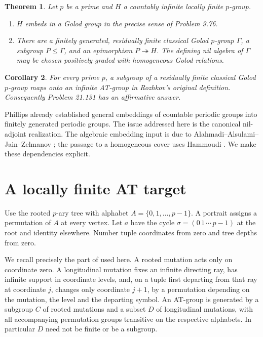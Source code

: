\documentclass[11pt]{article}
\newtheorem{theorem}{Theorem}
\newtheorem{corollary}[theorem]{Corollary}
\theoremstyle{definition}
\begin{document}
\begin{theorem}\label{thm:main}
Let \(p\) be a prime and \(H\) a countably infinite locally finite
\(p\)-group.
\begin{enumerate}[label=(\roman*),nosep]
\item \(H\) embeds in a Golod group in the precise sense of Problem 9.76.
\item There are a finitely generated, residually finite classical Golod
\(p\)-group \(\Gamma\), a subgroup \(P\leq\Gamma\), and an epimorphism
\(P\twoheadrightarrow H\). The defining nil algebra of \(\Gamma\) may be
chosen positively graded with homogeneous Golod relations.
\end{enumerate}
\end{theorem}

\begin{corollary}\label{cor:AT}
For every prime \(p\), a subgroup of a residually finite classical Golod
\(p\)-group maps onto an infinite AT-group in Rozhkov's original definition.
Consequently Problem 21.131 has an affirmative answer.
\end{corollary}

Phillips \cite{Phillips} already established general embeddings of
countable periodic groups into finitely generated periodic groups.
The issue addressed here is the canonical nil-adjoint realization.
The algebraic embedding input is due to
Alahmadi--Alsulami--Jain--Zelmanov \cite{AAJZshort,AAJZ};
the passage to a homogeneous cover uses Hammoudi \cite{Hammoudi}.
We make these dependencies explicit.

\section{A locally finite AT target}

Use the rooted \(p\)-ary tree with alphabet
\(A=\{0,1,\ldots,p-1\}\). A portrait assigns a permutation of \(A\)
at every vertex. Let \(a\) have the cycle
\(\sigma=(0\,1\,\cdots\,p-1)\) at the root and identity elsewhere.
Number tuple coordinates from zero and tree depths from zero.

We recall precisely the part of \cite[\S1]{Rozhkov} used here.
A rooted mutation acts only on coordinate zero. A longitudinal mutation
fixes an infinite directing ray, has infinite support in coordinate
levels, and, on a tuple first departing from that ray at coordinate \(j\),
changes only coordinate \(j+1\), by a permutation depending on the mutation,
the level and the departing symbol. An AT-group is generated by a subgroup
\(C\) of rooted mutations and a subset \(D\) of longitudinal mutations,
with all accompanying permutation groups transitive on the respective
alphabets. In particular \(D\) need not be finite or be a subgroup.
\end{document}
